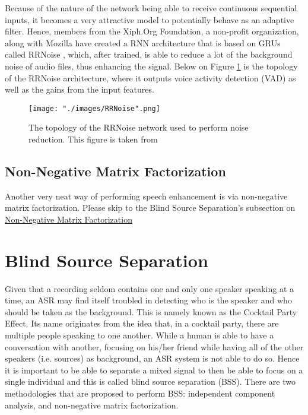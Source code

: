 Because of the nature of the network being able to receive continuous sequential inputs, it becomes a very attractive model to potentially behave as an adaptive filter. Hence, members from the Xiph.Org Foundation, a non-profit organization, along with Mozilla have created a RNN architecture that is based on GRUs called RRNoise \cite{rrnoise}, which, after trained, is able to reduce a lot of the background noise of audio files, thus enhancing the signal. Below on Figure \ref{fig::RRNoisearch} is the topology of the RRNoise architecture, where it outputs voice activity detection (VAD) as well as the gains from the input features.

\begin{figure}[H]
\begin{center}
    \texttt{[image: "./images/RRNoise".png]}
    \caption{The topology of the RRNoise network used to perform noise reduction. This figure is taken from \cite{rrnoise}}
    \label{fig::RRNoisearch}
\end{center}
\end{figure}

\subsection{Non-Negative Matrix Factorization}
Another very neat way of performing speech enhancement is via non-negative matrix factorization. Please skip to the Blind Source Separation's subsection on \hyperref[sec:NMF]{Non-Negative Matrix Factorization} \cite{spectralclustering}

\section{Blind Source Separation}
Given that a recording seldom contains one and only one speaker speaking at a time, an ASR may find itself troubled in detecting who is the speaker and who should be taken as the background. This is namely known as the Cocktail Party Effect. Its name originates from the idea that, in a cocktail party, there are multiple people speaking to one another. While a human is able to have a conversation with another, focusing on his/her friend while having all of the other speakers (i.e. sources) as background, an ASR system is not able to do so. Hence it is important to be able to separate a mixed signal to then be able to focus on a single individual and this is called blind source separation (BSS). There are two methodologies that are proposed to perform BSS: independent component analysis, and non-negative matrix factorization.

